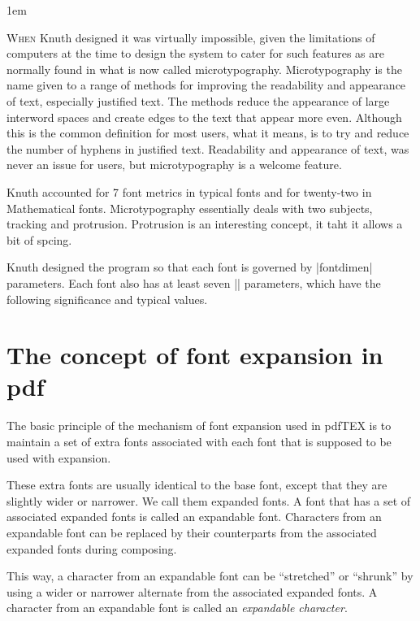 \medskip
\begin{multicols}{2}
\parindent1em

\lettrine{W}{hen} Knuth designed \tex it was virtually impossible, given the limitations of computers at the time to design the system to cater for such features as are normally found in what is now called microtypography. Microtypography is the name given to a range of methods for improving the readability and appearance of text, especially justified text. The methods reduce the appearance of large interword spaces and create edges to the text that appear more even. Although this is the common definition for most \alltex users, what it means, is to try and reduce the number of hyphens in justified text. Readability and appearance of text, was never an issue for \tex users, but microtypography is a welcome feature.

Knuth accounted for 7 font metrics in typical fonts and for twenty-two in Mathematical fonts. Microtypography essentially deals with two subjects, tracking and protrusion. Protrusion is an interesting concept, it taht it allows a bit of spcing.

Knuth designed the program so that each font is governed by |fontdimen| parameters. Each font also has at least seven |\fontdimen| parameters, which have the following significance and typical values. 


\section*{The concept of font expansion in pdf\tex}

The basic principle of the mechanism of font expansion used in pdfTEX is to maintain a 
set of extra fonts associated with each font that is supposed to be used with expansion. 

These extra fonts are usually identical to the base font, except that they are slightly wider or narrower. We call them expanded fonts. A font that has a set of associated expanded
fonts is called an expandable font. Characters from an expandable font can be
replaced by their counterparts from the associated expanded fonts during composing.

This way, a character from an expandable font can be “stretched” or “shrunk” by using a wider or narrower alternate from the associated expanded fonts. A character from an expandable font is called an \textit{expandable character}.


\end{multicols}
